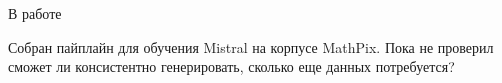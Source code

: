 В работе 

Собран пайплайн для обучения Mistral на корпусе MathPix. Пока не проверил сможет ли консистентно генерировать, сколько еще данных потребуется?